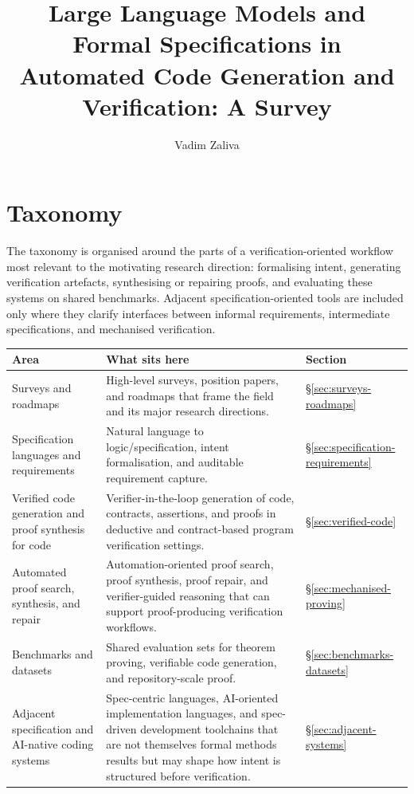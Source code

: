 \documentclass[natbib=false,acmsmall,nonacm,11pt]{acmart}
\title{Large Language Models and Formal Specifications in Automated Code Generation and Verification: A Survey}
\author{Vadim Zaliva}
\affiliation{%
  \institution{Tufts University}%
  \city{Medford}%
  \state{MA}%
  \country{USA}}
\begin{document}
\maketitle

\tableofcontents

\section{Taxonomy}

The taxonomy is organised around the parts of a verification-oriented workflow
most relevant to the motivating research direction: formalising intent,
generating verification artefacts, synthesising or repairing proofs, and
evaluating these systems on shared benchmarks. Adjacent specification-oriented
tools are included only where they clarify interfaces between informal
requirements, intermediate specifications, and mechanised verification.

\begin{longtable}{>{\raggedright\arraybackslash}p{} >{\raggedright\arraybackslash}p{} >{\raggedright\arraybackslash}p{}}
\toprule
\textbf{Area} & \textbf{What sits here} & \textbf{Section} \\
\midrule
\endhead
Surveys and roadmaps & High-level surveys, position papers, and roadmaps that frame the field and its major research directions. & \S\ref{sec:surveys-roadmaps} \\
Specification languages and requirements & Natural language to logic/specification, intent formalisation, and auditable requirement capture. & \S\ref{sec:specification-requirements} \\
Verified code generation and proof synthesis for code & Verifier-in-the-loop generation of code, contracts, assertions, and proofs in deductive and contract-based program verification settings. & \S\ref{sec:verified-code} \\
Automated proof search, synthesis, and repair & Automation-oriented proof search, proof synthesis, proof repair, and verifier-guided reasoning that can support proof-producing verification workflows. & \S\ref{sec:mechanised-proving} \\
Benchmarks and datasets & Shared evaluation sets for theorem proving, verifiable code generation, and repository-scale proof. & \S\ref{sec:benchmarks-datasets} \\
Adjacent specification and AI-native coding systems & Spec-centric languages, AI-oriented implementation languages, and spec-driven development toolchains that are not themselves formal methods results but may shape how intent is structured before verification. & \S\ref{sec:adjacent-systems} \\
\bottomrule
\end{longtable}
\end{document}
